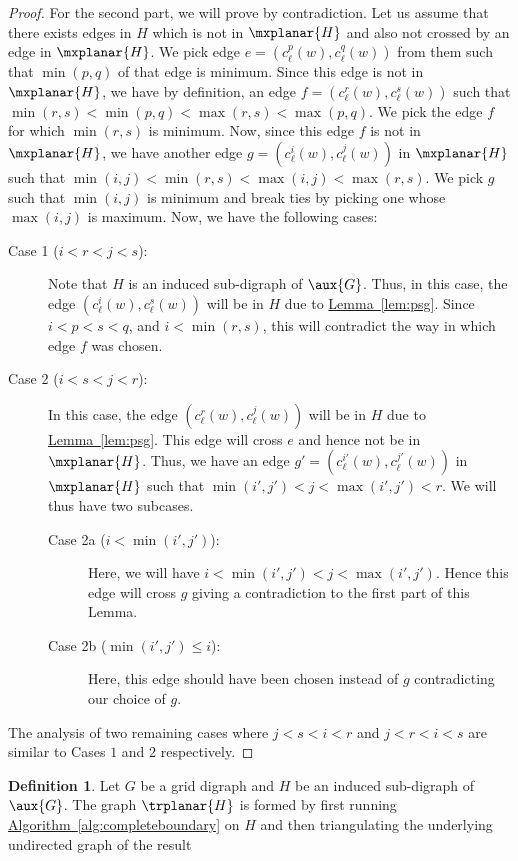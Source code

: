 \documentclass[11pt]{article}
\numberwithin{equation}{section}
\theoremstyle{definition}
\newtheorem{definition}[theorem]{Definition}
\theoremstyle{plain}
\newcommand{\expref}[2]{\hyperref[#2]{#1~\ref{#2}}}
\begin{document}
\begin{proof}
For the second part, we will prove by contradiction. Let us assume that there exists edges in $H$ which is not in $\mxplanar{H}$ and also not crossed by an edge in $\mxplanar{H}$. We pick edge $e = (c_{\ell}^p(w), c_{\ell}^q(w))$ from them such that $\min(p, q)$ of that edge is minimum. Since this edge is not %
 in $\mxplanar{H}$, we have by definition, an edge $f = (c_{\ell}^r(w), c_{\ell}^s(w))$ such that $\min(r,s) < \min(p, q) < \max(r, s) < \max(p, q)$. We pick the edge $f$ for which $\min(r,s)$ is minimum. Now, since this edge $f$ is not %
 in $\mxplanar{H}$, we have another edge $g = (c_{\ell}^i(w), c_{\ell}^j(w))$ in $\mxplanar{H}$ such that $\min(i,j) < \min(r, s) < \max(i, j) < \max(r, s)$. We pick $g$ such that $\min(i, j)$ is minimum and break ties by picking one whose $\max(i,j)$ is maximum. Now, we have the following cases:
\begin{description}
\item[Case 1 ($i < r < j < s$):] Note that $H$ is
%
an induced  %
sub-digraph %
 of $\aux{G}$. Thus, in this case, the edge $(c_{\ell}^i(w), c_{\ell}^s(w))$ will be %
 in $H$ due to \expref{Lemma}{lem:psg}. Since $i < p < s < q$, and $i< \min(r, s)$, this will contradict the way in which edge $f$ was chosen.
\item[Case 2 ($i < s < j < r$):] In this case, the edge $(c_{\ell}^r(w), c_{\ell}^j(w))$ will be %
 in $H$ due to \expref{Lemma}{lem:psg}. This edge will cross $e$ and hence not be %
 in $\mxplanar{H}$. Thus, we have an edge $g' = (c_{\ell}^{i'}(w), c_{\ell}^{j'}(w))$ in $\mxplanar{H}$ such that $\min(i', j') < j < \max(i',j') < r$. We will thus have two subcases.
\begin{description}
\item[Case 2a ($i < \min(i', j')$):] Here, we will have $i < \min(i', j') < j < \max(i', j')$. Hence this edge will cross $g$ giving a contradiction to the first part of this Lemma.
\item[Case 2b ($\min(i', j') \leq i$):] Here, this edge should have been chosen instead of $g$ contradicting our choice of $g$.
\end{description}
\end{description}
The analysis of two remaining cases where $j<s<i<r$ and $j < r < i < s$ are similar to Cases $1$ and $2$ respectively.
\end{proof}


\begin{definition}
Let $G$ be a grid %
digraph %
and $H$ be
%
an induced  %
sub-digraph %
 of $\aux{G}$. The graph $\trplanar{H}$ is formed by first running \expref{Algorithm}{alg:completeboundary} on $H$ and then triangulating the %
underlying undirected graph of the result%
\end{definition}
\end{document}
